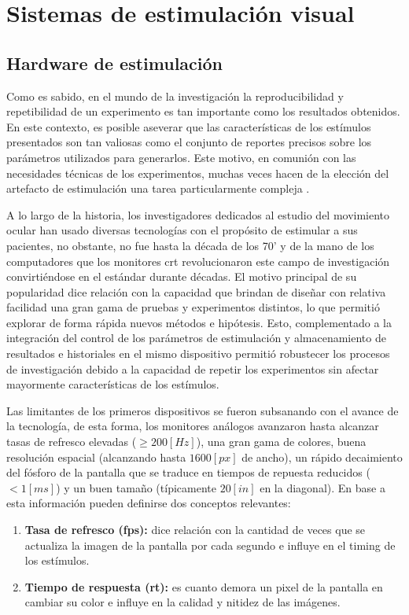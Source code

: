 \documentclass[../main.tex]{subfiles}
\begin{document}
	\section{Sistemas de estimulación visual}
	\label{sec:02_sistemas_de_estimulacion_visual}
		\subsection{Hardware de estimulación}
		\label{sub:02_hardware_de_estimulacion}

		Como es sabido, en el mundo de la investigación la reproducibilidad y repetibilidad de un experimento es tan importante como los resultados obtenidos. En este contexto, es posible aseverar que las características de los estímulos presentados son tan valiosas como el conjunto de reportes precisos sobre los parámetros utilizados para generarlos. Este motivo, en comunión con las necesidades técnicas de los experimentos, muchas veces hacen de la elección del artefacto de estimulación una tarea particularmente compleja \cite{article:monitor_beuer}.

		A lo largo de la historia, los investigadores dedicados al estudio del movimiento ocular han usado diversas tecnologías con el propósito de estimular a sus pacientes, no obstante, no fue hasta la década de los 70' y de la mano de los computadores que los monitores \acrshort{crt} revolucionaron este campo de investigación convirtiéndose en el estándar durante décadas. El motivo principal de su popularidad dice relación con la capacidad que brindan de diseñar con relativa facilidad una gran gama de pruebas y experimentos distintos, lo que permitió explorar de forma rápida nuevos métodos e hipótesis. Esto, complementado a la integración del control de los parámetros de estimulación y almacenamiento de resultados e historiales en el mismo dispositivo permitió robustecer los procesos de investigación debido a la capacidad de repetir los experimentos sin afectar mayormente características de los estímulos. 

		Las limitantes de los primeros dispositivos se fueron subsanando con el avance de la tecnología, de esta forma, los monitores análogos avanzaron hasta alcanzar tasas de refresco elevadas ($\geq 200[Hz]$), una gran gama de colores, buena resolución espacial (alcanzando hasta $1600[px]$ de ancho), un rápido decaimiento del fósforo de la pantalla que se traduce en tiempos de repuesta reducidos ($< 1[ms]$) y un buen tamaño (típicamente $20[in]$ en la diagonal). En base a esta información pueden definirse dos conceptos relevantes: 
		\begin{enumerate}
			\item \textbf{Tasa de refresco (\acrshort{fps}):} dice relación con la cantidad de veces que se actualiza la imagen de la pantalla por cada segundo e influye en el timing de los estímulos.
			\item \textbf{Tiempo de respuesta (\acrshort{rt}):} es cuanto demora un pixel de la pantalla en cambiar su color e influye en la calidad y nitidez de las imágenes. 
		\end{enumerate}
\end{document}
